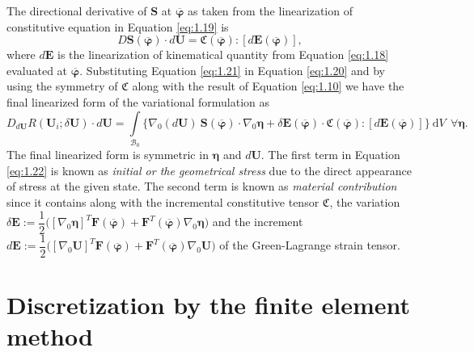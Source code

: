 \documentclass[11pt,a4paper,final]{article}
\begin{document}
The directional derivative of $\mathbf{S}$ at $\overline{\bm{\varphi}}$ as taken from the linearization of constitutive equation in Equation \eqref{eq:1.19} is 
\begin{equation}
D \mathbf{S}(\overline{\bm{\varphi}}) \cdot d\mathbf{U} = \mathfrak{C}(\overline{\bm{\varphi}}) : \left[ d \mathbf{E}(\overline{\bm{\varphi}}) \right],
\label{eq:1.21}
\end{equation}
where $d \mathbf{E}$ is the linearization of kinematical quantity from Equation \eqref{eq:1.18} evaluated at $\overline{\bm{\varphi}}$.  Substituting Equation \eqref{eq:1.21} in Equation \eqref{eq:1.20} and by using the symmetry of $\mathfrak{C}$ along with the result of Equation \eqref{eq:1.10} we have the final linearized form of the variational formulation as
\begin{equation}
D_{d\mathbf{U}} R(\mathbf{U}_i; \delta \mathbf{U}) \cdot d\mathbf{U} = \int\limits_{\mathcal{B}_0} \Big\lbrace \nabla_0 (d\mathbf{U}) \ \mathbf{S}(\overline{\bm{\varphi}}) \cdot \nabla_0 \bm{\eta} + \delta \mathbf{E}(\overline{\bm{\varphi}}) \cdot \mathfrak{C}(\overline{\bm{\varphi}}) : \left[ d\mathbf{E}(\overline{\bm{\varphi}}) \right] \Big\rbrace \ \mathrm{d}V \ \ \forall \bm{\eta}.
\label{eq:1.22}
\end{equation}
The final linearized form is symmetric in $\bm{\eta}$ and $d\mathbf{U}$. The first term in Equation \eqref{eq:1.22} is known as \textit{initial or the geometrical stress} due to the direct appearance of stress at the given state. The second term is known as \textit{material contribution} since it contains along with the incremental constitutive tensor $\mathfrak{C}$, the variation $\delta \mathbf{E} := \dfrac{1}{2} \Big(\left[\nabla_0 \bm{\eta}\right]^T \mathbf{F}(\overline{\bm{\varphi}}) + \mathbf{F}^T (\overline{\bm{\varphi}}) \nabla_0 \bm{\eta} \Big)$ and the increment $d \mathbf{E} := \dfrac{1}{2} \Big(\left[\nabla_0 \mathbf{U}\right]^T \mathbf{F}(\overline{\bm{\varphi}}) + \mathbf{F}^T (\overline{\bm{\varphi}}) \nabla_0 \mathbf{U} \Big)$ of the Green-Lagrange strain tensor.  
 
\section{Discretization by the finite element method}
\end{document}

